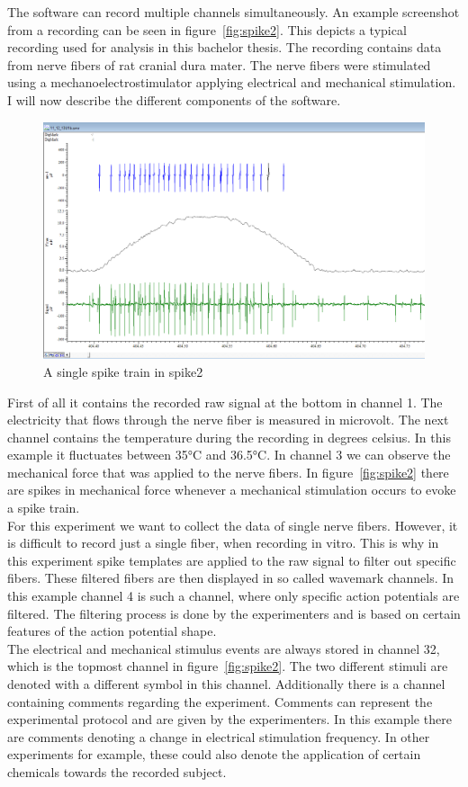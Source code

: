 The software can record multiple channels simultaneously. An example screenshot from a recording can be seen in figure~\ref{fig:spike2}. This depicts a typical recording used for analysis in this bachelor thesis. The recording contains data from nerve fibers of rat cranial dura mater. The nerve fibers were stimulated using a mechanoelectrostimulator applying electrical and mechanical stimulation. I will now describe the different components of the software.\\

\begin{figure}
	\includegraphics[width = \textwidth]{src/pic/Spike2_spike_train}
	\caption{A single spike train in spike2}
	\label{fig:spike_train}
\end{figure}

First of all it contains the recorded raw signal at the bottom in channel 1. The electricity that flows through the nerve fiber is measured in microvolt. The next channel contains the temperature during the recording in degrees celsius. In this example it fluctuates between 35°C and 36.5°C. In channel 3 we can observe the mechanical force that was applied to the nerve fibers. In figure~\ref{fig:spike2} there are spikes in mechanical force whenever a mechanical stimulation occurs to evoke a spike train. \\
For this experiment we want to collect the data of single nerve fibers. However, it is difficult to record just a single fiber, when recording in vitro. This is why in this experiment spike templates are applied to the raw signal to filter out specific fibers. These filtered fibers are then displayed in so called wavemark channels. In this example channel 4 is such a channel, where only specific action potentials are filtered. The filtering process is done by the experimenters and is based on certain features of the action potential shape.\\
The electrical and mechanical stimulus events are always stored in channel 32, which is the topmost channel in figure~\ref{fig:spike2}. The two different stimuli are denoted with a different symbol in this channel. Additionally there is a channel containing comments regarding the experiment. Comments can represent the experimental protocol and are given by the experimenters. In this example there are comments denoting a change in electrical stimulation frequency. In other experiments for example, these could also denote the application of certain chemicals towards the recorded subject.

